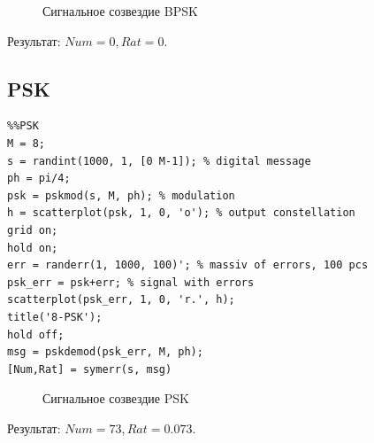 \documentclass[a4paper,14pt]{article}
\begin{document}
\begin{figure}[bh]
\noindent{}
\caption{Сигнальное созвездие BPSK}
\label{figCurves}
\end{figure}
Результат: $Num=0, Rat=0$.

\newpage
\subsection{PSK}

\begin{lstlisting}
%%PSK
M = 8;
s = randint(1000, 1, [0 M-1]); % digital message
ph = pi/4;
psk = pskmod(s, M, ph); % modulation
h = scatterplot(psk, 1, 0, 'o'); % output constellation
grid on;
hold on;
err = randerr(1, 1000, 100)'; % massiv of errors, 100 pcs
psk_err = psk+err; % signal with errors
scatterplot(psk_err, 1, 0, 'r.', h);
title('8-PSK');
hold off;
msg = pskdemod(psk_err, M, ph);
[Num,Rat] = symerr(s, msg)
\end{lstlisting}

\begin{figure}[bh]
\noindent{}
\caption{Сигнальное созвездие PSK}
\label{figCurves}
\end{figure}
Результат: $Num=73, Rat=0.073$.
\end{document}
